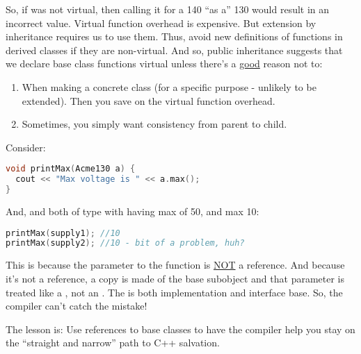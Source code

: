 So, if  was not virtual, then calling it for a 140 ``as a'' 130 would result in an incorrect value. Virtual function overhead is expensive. But extension by inheritance requires us to use them. Thus, avoid new definitions of functions in derived classes if they are non-virtual. And so, public inheritance suggests that we declare base class functions virtual unless there's a \underline{good} reason not to:

\begin{enumerate}
  \item When making a concrete class (for a specific purpose - unlikely to be extended). Then you save on the virtual function overhead.
  \item Sometimes, you simply want consistency from parent to child.
\end{enumerate}

Consider:

\begin{lstlisting}[language=C++]
void printMax(Acme130 a) {
  cout << "Max voltage is " << a.max();
}
\end{lstlisting}

And,  and  both of type  with  having max of 50, and  max 10:

\begin{lstlisting}[language=C++]
printMax(supply1); //10
printMax(supply2); //10 - bit of a problem, huh?
\end{lstlisting}

This is because the parameter to the function is \underline{NOT} a reference. And because it's not a reference, a copy is made of the base subobject and that parameter is treated like a , not an . The  is both implementation and interface base. So, the compiler can't catch the mistake!

The lesson is: Use references to base classes to have the compiler help you stay on the ``straight and narrow'' path to C++ salvation.